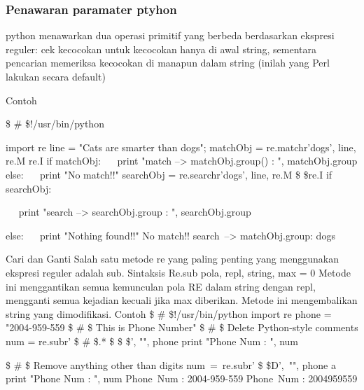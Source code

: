 \subsubsection {Penawaran paramater ptyhon}
python menawarkan dua operasi primitif yang berbeda berdasarkan ekspresi reguler: cek kecocokan untuk kecocokan hanya di awal string, sementara pencarian memeriksa kecocokan di manapun dalam string (inilah yang Perl lakukan secara default)

Contoh 

 \$  \#  \$!/usr/bin/python \par
import re 
line = "Cats are smarter than dogs"; 
matchObj = re.match{r'dogs', line, re.M  \vert  re.I}  
if matchObj: 
~~ print "match --> matchObj.group() : ", matchObj.group{} 
else: 
~~ print "No match!!" 
searchObj = re.search{r'dogs', line, re.M \$  \vert  \$re.I} 
if searchObj: 
\item
~~ print "search --> searchObj.group{} : ", searchObj.group{} 
\item
else: 
~~ print "Nothing found!!" 
No match!!
search~--> matchObj.group{}:  dogs 
\item
Cari dan Ganti 
Salah satu metode re yang paling penting yang menggunakan ekspresi reguler adalah sub.  
Sintaksis 
Re.sub {pola, repl, string, max = 0} 
Metode ini menggantikan semua kemunculan pola RE dalam string dengan repl, mengganti semua kejadian kecuali jika max diberikan. Metode ini mengembalikan string yang dimodifikasi. 
Contoh 
 \$  \#  \$!/usr/bin/python 
import re 
phone = "2004-959-559  \$  \#  \$ This is Phone Number" 
 \$  \#  \$ Delete Python-style comments 
num = re.sub{r' \$  \#  \$.* \$  \$  \$', "", phone} 
print "Phone Num : ", num 
\item
 \$  \#  \$ Remove anything other than digits 
num~=~re.sub{r' \$  \setminus  \$D',~"", phone}     a
print "Phone Num : ", num  
Phone~Num :  2004-959-559 
Phone~Num :  2004959559 
